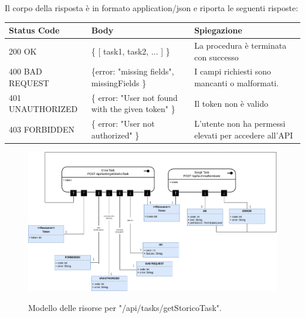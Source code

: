\documentclass{report}
\begin{document}
Il corpo della risposta è in formato application/json e riporta le seguenti risposte:

\begin{center} %
	\centering
	\begin{tabular}{ |p{4cm}|p{4cm}|p{4cm}| }
		\hline
		\centering Status Code & \qquad\qquad\quad Body                             & \qquad\quad Spiegazione                               \\ %
		\hline
		200 OK                 & \{ [ task1, task2, ... ] \}                        & La procedura è terminata con successo                 \\
		\hline
		400 BAD REQUEST        & \{error: "missing fields", missingFields \}        & I campi richiesti sono mancanti o malformati.         \\
		\hline
		401 UNAUTHORIZED       & \{ error: "User not found with the given token" \} & Il token non è valido                                 \\
		\hline
		403 FORBIDDEN          & \{ error: "User not authorized" \}                 & L'utente non ha permessi elevati per accedere all'API \\
		\hline
	\end{tabular}
\end{center}


\begin{figure}[H]
	\centering\includegraphics[width=1\textwidth]{images/model_storico_task.png}

	Modello delle risorse per "/api/tasks/getStoricoTask".
\end{figure}
\end{document}
